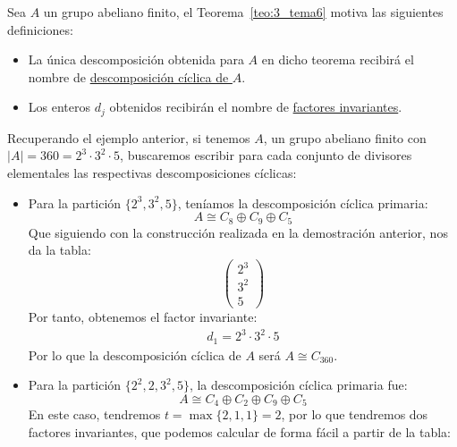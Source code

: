 \begin{definicion}
    Sea $A$ un grupo abeliano finito, el Teorema~\ref{teo:3_tema6} motiva las siguientes definiciones:
    \begin{itemize}
        \item La única descomposición obtenida para $A$ en dicho teorema recibirá el nombre de \underline{descomposición cíclica de $A$}.
        \item Los enteros $d_j$ obtenidos recibirán el nombre de \underline{factores invariantes}.
    \end{itemize}
\end{definicion}

\begin{ejemplo}
    Recuperando el ejemplo anterior, si tenemos $A$, un grupo abeliano finito con $|A| = 360 = 2^3\cdot 3^2\cdot 5$, buscaremos escribir para cada conjunto de divisores elementales las respectivas descomposiciones cíclicas:
    \begin{itemize}
        \item Para la partición $\{2^3, 3^2, 5\}$, teníamos la descomposición cíclica primaria:
            \begin{equation*}
                A\cong C_8\oplus C_9\oplus C_5 
            \end{equation*}
            Que siguiendo con la construcción realizada en la demostración anterior, nos da la tabla:
            \begin{equation*}
                \left(\begin{array}{ccc}
                    2^3 \\
                    3^2 \\
                    5 
                \end{array}\right)
            \end{equation*}
            Por tanto, obtenemos el factor invariante:
            \begin{align*}
                d_1 = 2^3\cdot 3^2\cdot 5
            \end{align*}
            Por lo que la descomposición cíclica de $A$ será $A\cong C_{360}$.
        \item Para la partición $\{2^2, 2, 3^2, 5\}$, la descomposición cíclica primaria fue:
            \begin{equation*}
                A \cong C_4 \oplus C_2 \oplus C_9 \oplus C_5
            \end{equation*}
            En este caso, tendremos $t = \max\{2, 1, 1\} = 2$, por lo que tendremos dos factores invariantes, que podemos calcular de forma fácil a partir de la tabla:

\end{itemize}
\end{ejemplo}
